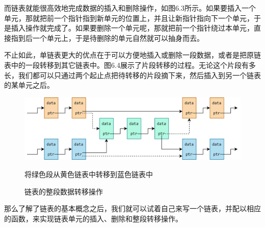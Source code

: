 而链表就能很高效地完成数据的插入和删除操作，如图6.3所示。如果要插入一个单元，那就把前一个指针指到新单元的位置上，并且让新指针指向下一个单元，于是插入操作就完成了。如果要删除一个单元呢，那就把前一个指针绕过本单元，直接指到后一个单元上，于是待删除的单元自然就可以抽身而去。\par
不止如此，单链表更大的优点在于可以方便地插入或删除一段数据，或者是把原链表中的一段转移到其它链表中。图6.4展示了片段转移的过程。无论这个片段有多长，我们都可以只通过两个起止点把待转移的片段摘下来，然后插入到另一个链表的某单元之后。\par
\begin{figure}[htbp]
    \centering
    \includegraphics[width=\textwidth]{../images/generalized_parts/06_advanced_operation_on_list.drawio.png}
    \caption{链表的整段数据转移操作}
    \footnotesize{将绿色段从黄色链表中转移到蓝色链表中}
\end{figure}
那么了解了链表的基本概念之后，我们就可以试着自己来写一个链表，并配以相应的函数，来实现链表单元的插入、删除和整段转移操作。\par
